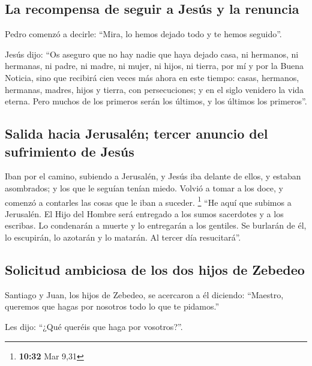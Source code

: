\begin{paracol}{2}
{\subsection{La recompensa de seguir a Jesús y la
renuncia}\label{la-recompensa-de-seguir-a-jesuxfas-y-la-renuncia}}

 Pedro comenzó a decirle: ``Mira, lo hemos dejado todo y
te hemos seguido''.

 Jesús dijo: ``Os aseguro que no hay nadie que haya
dejado casa, ni hermanos, ni hermanas, ni padre, ni madre, ni mujer, ni
hijos, ni tierra, por mí y por la Buena Noticia,  sino
que recibirá cien veces más ahora en este tiempo: casas, hermanos,
hermanas, madres, hijos y tierra, con persecuciones; y en el siglo
venidero la vida eterna.  Pero muchos de los primeros
serán los últimos, y los últimos los primeros''.

\hypertarget{salida-hacia-jerusaluxe9n-tercer-anuncio-del-sufrimiento-de-jesuxfas}{%
\subsection{Salida hacia Jerusalén; tercer anuncio del sufrimiento de
Jesús}\label{salida-hacia-jerusaluxe9n-tercer-anuncio-del-sufrimiento-de-jesuxfas}}

 Iban por el camino, subiendo a Jerusalén, y Jesús iba
delante de ellos, y estaban asombrados; y los que le seguían tenían
miedo. Volvió a tomar a los doce, y comenzó a contarles las cosas que le
iban a suceder. \footnote{\textbf{10:32} Mar 9,31}  ``He
aquí que subimos a Jerusalén. El Hijo del Hombre será entregado a los
sumos sacerdotes y a los escribas. Lo condenarán a muerte y lo
entregarán a los gentiles.  Se burlarán de él, lo
escupirán, lo azotarán y lo matarán. Al tercer día resucitará''.

\hypertarget{solicitud-ambiciosa-de-los-dos-hijos-de-zebedeo}{%
\subsection{Solicitud ambiciosa de los dos hijos de
Zebedeo}\label{solicitud-ambiciosa-de-los-dos-hijos-de-zebedeo}}

 Santiago y Juan, los hijos de Zebedeo, se acercaron a él
diciendo: ``Maestro, queremos que hagas por nosotros todo lo que te
pidamos.''

 Les dijo: ``¿Qué queréis que haga por vosotros?''.


\end{paracol}
